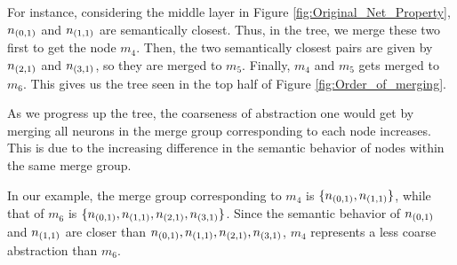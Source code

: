 For instance, considering the middle layer in Figure
\ref{fig:Original_Net_Property}, $n_{(0,1)}$ and $n_{(1,1)}$ are semantically
closest. Thus, in the tree, we merge these two first to get the node $m_4$.
Then, the two semantically closest pairs are given by $n_{(2,1)}$ and
$n_{(3,1)}$, so they are merged to $m_5$. Finally, $m_4$ and $m_5$ gets merged
to $m_6$. This gives us the tree seen in the top half of Figure
\ref{fig:Order_of_merging}.

%
%
%

As we progress up the tree, the coarseness of abstraction one would get by
merging all neurons in the merge group corresponding to each node increases. 
This is due to the increasing difference in the semantic behavior of nodes
within the same merge group. 

In our example, the merge group corresponding to
$m_4$ is $\{n_{(0,1)}, n_{(1,1)}\}$, while that of $m_6$ is $\{n_{(0,1)},
n_{(1,1)}, n_{(2,1)}, n_{(3,1)}\}$. Since the semantic behavior of $n_{(0,1)}$
and $n_{(1,1)}$ are closer than $n_{(0,1)}, n_{(1,1)}, n_{(2,1)}, n_{(3,1)}$,
$m_4$ represents a less coarse abstraction than $m_6$.

